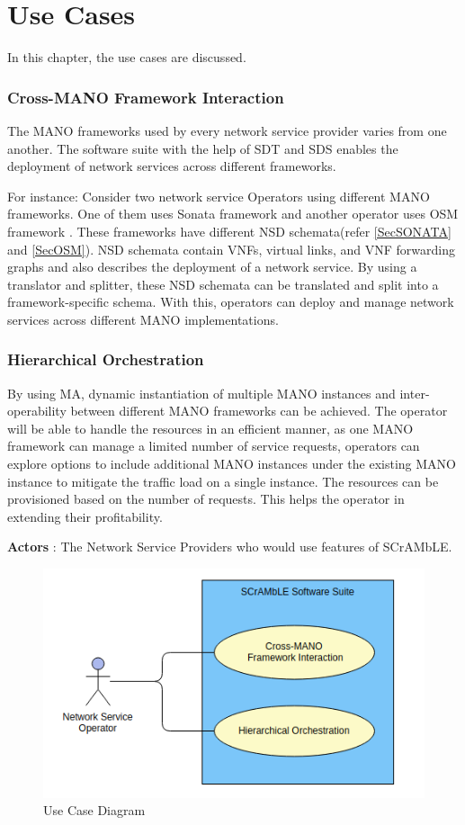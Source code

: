 \chapter{Use Cases}
\label{ch:Use Cases}

In this chapter, the use cases are discussed.

\subsection{Cross-MANO Framework Interaction}
The MANO frameworks used by every network service provider varies from one another. The software suite with the help of SDT and SDS enables the deployment of network services across different frameworks.

For instance: Consider two network service Operators using different MANO frameworks. One of them uses Sonata framework \cite{draxler2017sonata} and another operator uses OSM framework \cite{ersue2013etsi}. These frameworks have different NSD schemata(refer \ref{SecSONATA} and \ref{SecOSM}). NSD schemata contain VNFs, virtual links, and VNF forwarding graphs and also describes the deployment of a network service. By using a translator and splitter, these NSD schemata can be translated and split into a framework-specific schema. With this, operators can deploy and manage network services across different MANO implementations.

\subsection{Hierarchical Orchestration}
By using MA, dynamic instantiation of multiple MANO instances and inter-operability between different MANO frameworks can be achieved. The operator will be able to handle the resources in an efficient manner, as one MANO framework can manage a limited number of service requests, operators can explore options to include additional MANO instances under the existing MANO instance to mitigate the traffic load on a single instance. The resources can be provisioned based on the number of requests. This helps the operator in extending their profitability.

\newpage
\textbf{Actors} : The Network Service Providers who would use features of SCrAMbLE.

\begin{figure}
	\includegraphics[width=1.0\linewidth]{figures/use-case}
	\caption{Use Case Diagram}
	\label{fig:use-case}
\end{figure}





